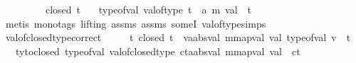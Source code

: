 \begin{isabellebody}
\ \ \ \ \ \ \ \ \ {\isachardoublequoteopen}closed\ t{\isacharprime}{\kern0pt}{\isachardoublequoteclose}\isanewline
\ \ \ {\isachardoublequoteopen}type{\isacharunderscore}{\kern0pt}of{\isacharunderscore}{\kern0pt}val\ {\isacharparenleft}{\kern0pt}{\isacharparenleft}{\kern0pt}val{\isacharunderscore}{\kern0pt}of{\isacharunderscore}{\kern0pt}type\ t{\isacharprime}{\kern0pt}{\isacharparenright}{\kern0pt}\ {\isacharcolon}{\kern0pt}{\isacharcolon}{\kern0pt}\ {\isacharparenleft}{\kern0pt}{\isacharprime}{\kern0pt}a{\isacharcomma}{\kern0pt}\ {\isacharprime}{\kern0pt}m{\isacharparenright}{\kern0pt}\ val{\isacharparenright}{\kern0pt}\ {\isacharequal}{\kern0pt}\ t{\isacharprime}{\kern0pt}{\isachardoublequoteclose}\isanewline
%
\isadelimproof
\ \ %
\endisadelimproof
%
\isatagproof
{}\isamarkupfalse%
\ {\isacharparenleft}{\kern0pt}metis\ {\isacharparenleft}{\kern0pt}mono{\isacharunderscore}{\kern0pt}tags{\isacharcomma}{\kern0pt}\ lifting{\isacharparenright}{\kern0pt}\ assms{\isacharparenleft}{\kern0pt}{}{\isacharparenright}{\kern0pt}\ assms{\isacharparenleft}{\kern0pt}{}{\isacharparenright}{\kern0pt}\ someI\ val{\isacharunderscore}{\kern0pt}of{\isacharunderscore}{\kern0pt}type{\isachardot}{\kern0pt}simps{\isacharparenright}{\kern0pt}%
\endisatagproof
{\isafoldproof}%
%
\isadelimproof
\isanewline
%
\endisadelimproof
\isanewline
{}\isamarkupfalse%
\ val{\isacharunderscore}{\kern0pt}of{\isacharunderscore}{\kern0pt}closed{\isacharunderscore}{\kern0pt}type{\isacharunderscore}{\kern0pt}correct{\isacharcolon}{\kern0pt}\ \isanewline
\ \ \ {\isachardoublequoteopen}{\isasymAnd}\ t{\isachardot}{\kern0pt}\ closed\ t\ {\isasymLongrightarrow}\ {\isasymexists}v{\isacharcolon}{\kern0pt}{\isacharcolon}{\kern0pt}{\isacharparenleft}{\kern0pt}{\isacharprime}{\kern0pt}a{\isacharcolon}{\kern0pt}{\isacharcolon}{\kern0pt}absval{\isacharcomma}{\kern0pt}\ {\isacharprime}{\kern0pt}m{\isacharcolon}{\kern0pt}{\isacharcolon}{\kern0pt}mapval{\isacharparenright}{\kern0pt}\ val{\isachardot}{\kern0pt}\ type{\isacharunderscore}{\kern0pt}of{\isacharunderscore}{\kern0pt}val\ v\ {\isacharequal}{\kern0pt}\ t{\isachardoublequoteclose}\isanewline
\ \ \ {\isachardoublequoteopen}ty{\isacharunderscore}{\kern0pt}to{\isacharunderscore}{\kern0pt}closed\ {\isacharparenleft}{\kern0pt}type{\isacharunderscore}{\kern0pt}of{\isacharunderscore}{\kern0pt}val\ {\isacharparenleft}{\kern0pt}{\isacharparenleft}{\kern0pt}val{\isacharunderscore}{\kern0pt}of{\isacharunderscore}{\kern0pt}closed{\isacharunderscore}{\kern0pt}type\ ct{\isacharparenright}{\kern0pt}{\isacharcolon}{\kern0pt}{\isacharcolon}{\kern0pt}{\isacharparenleft}{\kern0pt}{\isacharprime}{\kern0pt}a{\isacharcolon}{\kern0pt}{\isacharcolon}{\kern0pt}absval{\isacharcomma}{\kern0pt}\ {\isacharprime}{\kern0pt}m{\isacharcolon}{\kern0pt}{\isacharcolon}{\kern0pt}mapval{\isacharparenright}{\kern0pt}\ val{\isacharparenright}{\kern0pt}{\isacharparenright}{\kern0pt}\ {\isacharequal}{\kern0pt}\ ct{\isachardoublequoteclose}\isanewline

\end{isabellebody}
